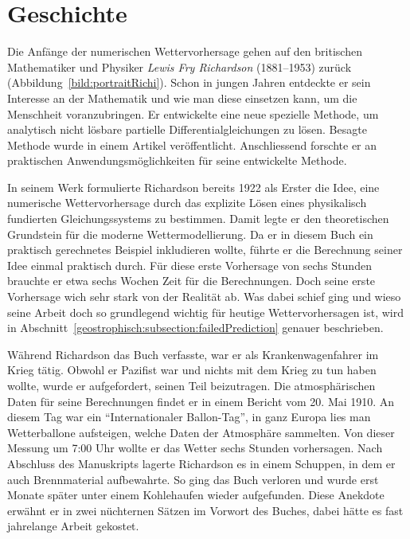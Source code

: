 %
%
%
%
\section{Geschichte\label{geostrophisch:section:geschichte}}

Die Anfänge der numerischen Wettervorhersage gehen auf den britischen Mathematiker und Physiker \emph{Lewis Fry Richardson} (1881–1953) zurück (Abbildung~\ref{bild:portraitRichi}).
%
%
Schon in jungen Jahren entdeckte er sein Interesse an der Mathematik und wie man diese einsetzen kann, um die Menschheit voranzubringen.
Er entwickelte eine neue spezielle Methode, um analytisch nicht lösbare partielle Differentialgleichungen zu lösen. 
Besagte Methode wurde in einem Artikel veröffentlicht.
Anschliessend forschte er an praktischen Anwendungsmöglichkeiten für seine entwickelte Methode.

In seinem Werk \cite{geostrophisch:wpbnp} formulierte Richardson bereits 1922 als Erster die Idee, eine numerische Wettervorhersage durch das explizite Lösen eines physikalisch fundierten Gleichungssystems zu bestimmen.  
Damit legte er den theoretischen Grundstein für die moderne Wettermodellierung.
%
Da er in diesem Buch ein praktisch gerechnetes Beispiel inkludieren wollte, führte er die Berechnung seiner Idee einmal praktisch durch.
Für diese erste Vorhersage von sechs Stunden brauchte er etwa sechs Wochen Zeit für die Berechnungen.
Doch seine erste Vorhersage wich sehr stark von der Realität ab.
Was dabei schief ging und wieso seine Arbeit doch so grundlegend wichtig für heutige Wettervorhersagen ist, wird in Abschnitt~\ref{geostrophisch:subsection:failedPrediction} genauer beschrieben.

Während Richardson das Buch \cite{geostrophisch:wpbnp} verfasste, war er als Krankenwagenfahrer im Krieg tätig. 
Obwohl er Pazifist war und nichts mit dem Krieg zu tun haben wollte, wurde er aufgefordert, seinen Teil beizutragen. 
Die atmosphärischen Daten für seine Berechnungen findet er in einem Bericht vom 20. Mai 1910. 
An diesem Tag war ein ``Internationaler Ballon-Tag'', in ganz Europa lies man Wetterballone aufsteigen, welche Daten der Atmosphäre sammelten.
%
%
Von dieser Messung um 7:00 Uhr wollte er das Wetter sechs Stunden vorhersagen. 
Nach Abschluss des Manuskripts lagerte Richardson es in einem Schuppen, in dem er auch Brennmaterial aufbewahrte.
So ging das Buch verloren und wurde erst Monate später unter einem Kohlehaufen wieder aufgefunden.
Diese Anekdote erwähnt er in zwei nüchternen Sätzen im Vorwort des Buches, dabei hätte es fast jahrelange Arbeit gekostet. 


